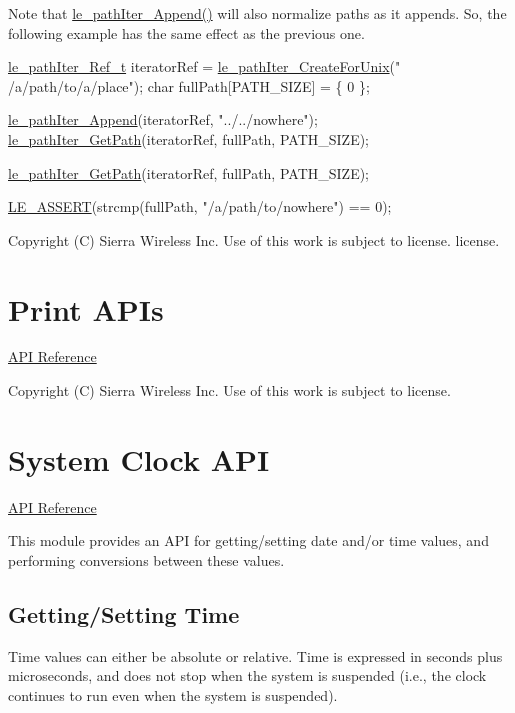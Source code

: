 Note that {\ttfamily \hyperlink{le__path_iter_8h_ae6aa59696c54d2523009037cc78f9725}{le\+\_\+path\+Iter\+\_\+\+Append()}} will also normalize paths as it appends. So, the following example has the same effect as the previous one.


\begin{DoxyCode}
\hyperlink{le__path_iter_8h_a0facb15e56e7ef896384eca415a7147a}{le\_pathIter\_Ref\_t} iteratorRef = \hyperlink{le__path_iter_8h_a35a38b307f9fdc0de82552e96a5a2d1d}{le\_pathIter\_CreateForUnix}(\textcolor{stringliteral}{"
      /a/path/to/a/place"});
\textcolor{keywordtype}{char} fullPath[PATH\_SIZE] = \{ 0 \};

\hyperlink{le__path_iter_8h_ae6aa59696c54d2523009037cc78f9725}{le\_pathIter\_Append}(iteratorRef, \textcolor{stringliteral}{"../../nowhere"});
\hyperlink{le__path_iter_8h_a4a1c39584a779518395b41f957765283}{le\_pathIter\_GetPath}(iteratorRef, fullPath, PATH\_SIZE);

\hyperlink{le__path_iter_8h_a4a1c39584a779518395b41f957765283}{le\_pathIter\_GetPath}(iteratorRef, fullPath, PATH\_SIZE);

\hyperlink{le__log_8h_ac0dbbef91dc0fed449d0092ff0557b39}{LE\_ASSERT}(strcmp(fullPath, \textcolor{stringliteral}{"/a/path/to/nowhere"}) == 0);
\end{DoxyCode}






Copyright (C) Sierra Wireless Inc. Use of this work is subject to license. license. \hypertarget{c_print}{}\section{Print A\+P\+Is}\label{c_print}
\hyperlink{le__print_8h}{A\+P\+I Reference}





Copyright (C) Sierra Wireless Inc. Use of this work is subject to license. \hypertarget{c_clock}{}\section{System Clock A\+P\+I}\label{c_clock}
\hyperlink{le__clock_8h}{A\+P\+I Reference}





This module provides an A\+P\+I for getting/setting date and/or time values, and performing conversions between these values.\hypertarget{c_clock_clk_time}{}\subsection{Getting/\+Setting Time}\label{c_clock_clk_time}
Time values can either be absolute or relative. Time is expressed in seconds plus microseconds, and does not stop when the system is suspended (i.\+e., the clock continues to run even when the system is suspended).

